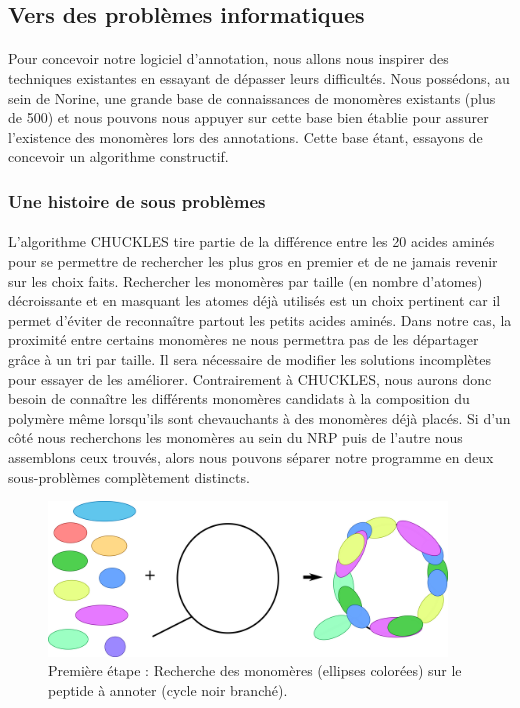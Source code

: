 \documentclass[12pt,french,twoside]{report}
\begin{document}
\subsection{Vers des problèmes informatiques}

\paragraph{}Pour concevoir notre logiciel d'annotation, nous allons nous inspirer des techniques existantes en essayant de dépasser leurs difficultés.
Nous possédons, au sein de Norine, une grande base de connaissances de monomères existants (plus de 500) et nous pouvons nous appuyer sur cette base bien établie pour assurer l'existence des monomères lors des annotations.
Cette base étant, essayons de concevoir un algorithme constructif.


\subsubsection{Une histoire de sous problèmes}

\paragraph{}L'algorithme CHUCKLES tire partie de la différence entre les 20 acides aminés pour se permettre de rechercher les plus gros en premier et de ne jamais revenir sur les choix faits.
Rechercher les monomères par taille (en nombre d'atomes) décroissante et en masquant les atomes déjà utilisés est un choix pertinent car il permet d'éviter de reconnaître partout les petits acides aminés.
Dans notre cas, la proximité entre certains monomères ne nous permettra pas de les départager grâce à un tri par taille.
Il sera nécessaire de modifier les solutions incomplètes pour essayer de les améliorer.
Contrairement à CHUCKLES, nous aurons donc besoin de connaître les différents monomères candidats à la composition du polymère même lorsqu'ils sont chevauchants à des monomères déjà placés.
Si d'un côté nous recherchons les monomères au sein du NRP puis de l'autre nous assemblons ceux trouvés, alors nous pouvons séparer notre programme en deux sous-problèmes complètement distincts.

\begin{figure}[!ht]
  \begin{center}
    \includegraphics[width=400px]{Figures/s2m/Intro/searching.png}
    \caption{\label{search_fig}Première étape : Recherche des monomères (ellipses colorées) sur le peptide à annoter (cycle noir branché).}
  \end{center}
\end{figure}
\end{document}
